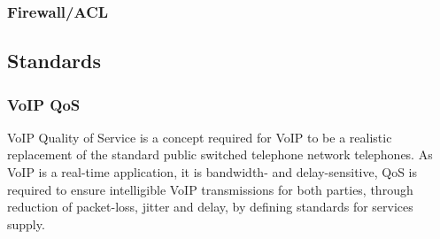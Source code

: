 \subsubsection{Firewall/ACL}


\subsection{Standards}

\subsubsection{VoIP QoS}
VoIP Quality of Service is a concept required for VoIP to be a realistic replacement of the standard public switched telephone network telephones.
As VoIP is a real-time application, it is bandwidth- and delay-sensitive, QoS is required to ensure intelligible VoIP transmissions for both parties, through reduction of packet-loss, jitter and delay, by defining standards for services supply. \cite{VoIP-QoS}
